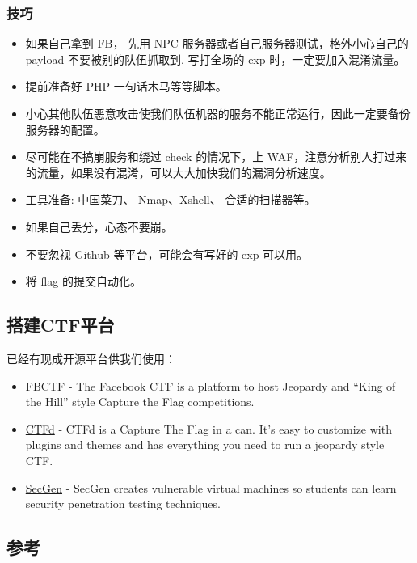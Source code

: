 \subsubsection{技巧}
\begin{itemize}
    \item 如果自己拿到 FB， 先用 NPC 服务器或者自己服务器测试，格外小心自己的 payload 不要被别的队伍抓取到, 写打全场的 exp 时，一定要加入混淆流量。
    \item 提前准备好 PHP 一句话木马等等脚本。
    \item 小心其他队伍恶意攻击使我们队伍机器的服务不能正常运行，因此一定要备份服务器的配置。
    \item 尽可能在不搞崩服务和绕过 check 的情况下，上 WAF，注意分析别人打过来的流量，如果没有混淆，可以大大加快我们的漏洞分析速度。
    \item 工具准备: 中国菜刀、 Nmap、Xshell、 合适的扫描器等。
    \item 如果自己丢分，心态不要崩。
    \item 不要忽视 Github 等平台，可能会有写好的 exp 可以用。
    \item 将 flag 的提交自动化。
\end{itemize}



\subsection{搭建CTF平台}
\indent \setlength{\parindent}{2em}
\indent 已经有现成开源平台供我们使用：
\indent \begin{itemize}
    \item \href{https://github.com/facebook/fbctf}{FBCTF} - The Facebook CTF is a platform to host Jeopardy and “King of the Hill” style Capture the Flag competitions.
    
    \item \href{https://github.com/CTFd/CTFd}{CTFd} - CTFd is a Capture The Flag in a can. It's easy to customize with plugins and themes and has everything you need to run a jeopardy style CTF.
    
    \item \href{https://github.com/cliffe/SecGen}{SecGen} - SecGen creates vulnerable virtual machines so students can learn security penetration testing techniques.
\end{itemize}

\subsection{参考}
\indent \setlength{\parindent}{2em}

